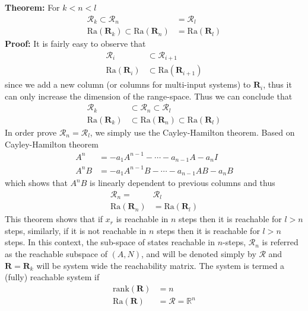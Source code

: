 \documentclass[twoside]{article}
\begin{document}
\textbf{Theorem:} For $k < n < l$
%
\begin{align*}
 \mathcal{R}_k \subset \mathcal{R}_{n} &= \mathcal{R}_{l} 
  \\
  \mathrm{Ra} ( \mathbf{R}_k ) \subset \mathrm{Ra} ( \mathbf{R}_{n} ) &= \mathrm{Ra} ( \mathbf{R}_{l} )
\end{align*}
%
\textbf{Proof:} It is fairly easy to observe that
%
\begin{align*}
\mathcal{R}_i & \subset \mathcal{R}_{i+1} 
\\
\mathrm{Ra} ( \mathbf{R}_i ) & \subset \mathrm{Ra} ( \mathbf{R}_{i+1} )
\end{align*}
%
since we add a new column (or columns for multi-input systems) to $ \mathbf{R}_i$, thus it can only increase the dimension of the range-space. Thus we can conclude that 
%
%
\begin{align*}
 \mathcal{R}_k &\subset \mathcal{R}_{n} \subset \mathcal{R}_{l} 
  \\
  \mathrm{Ra} ( \mathbf{R}_k ) &\subset \mathrm{Ra} ( \mathbf{R}_{n} ) \subset \mathrm{Ra} ( \mathbf{R}_{l} )
\end{align*}
%
In order prove $\mathcal{R}_{n} = \mathcal{R}_{l} $, we simply use the Cayley-Hamilton theorem. 
Based on Cayley-Hamilton theorem 
%
\begin{align*}
 A^n &= -a_1 A^{n-1} - \cdots - a_{n-1} A - a_n I
 \\
 A^n B &= -a_1 A^{n-1} B - \cdots - a_{n-1} A B - a_n B
\end{align*}
%
which shows that $ A^n B$ is linearly dependent to previous columns and thus 
%
%
\begin{align*}
\mathcal{R}_{n} =& \mathcal{R}_{l} 
  \\
\mathrm{Ra} ( \mathbf{R}_{n} ) &= \mathrm{Ra} ( \mathbf{R}_{l} )
\end{align*}
%
This theorem shows that if $x_r$ is reachable in $n$ steps then it is reachable for $l > n$ steps, similarly, if it is not reachable in 
$n$ steps then it is reachable for $l > n$ steps. In this context, the sub-space of states reachable in $n$-steps, $\mathcal{R}_n$
is referred as the reachable subspace of $(A,N)$, and will be denoted simply by $\mathcal{R}$ and $\mathbf{R} = \mathbf{R}_k$ will be system 
wide the reachability matrix. The system is termed a (fully) reachable system if 
%
\begin{align*}
 \mathrm{rank} (\mathbf{R}) &= n 
 \\
 \mathrm{Ra} (\mathbf{R}) &= \mathcal{R} = \mathbb{R}^n
\end{align*}
\end{document}
